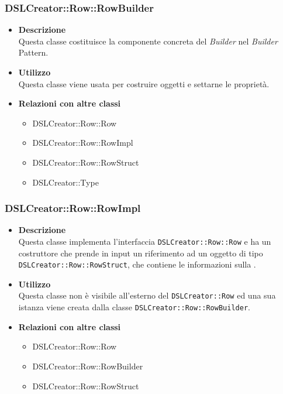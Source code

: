  \subsubsection{DSLCreator::Row::RowBuilder}
                    \begin{itemize}
                        \item \textbf{Descrizione} \hfill \\
                          Questa classe costituisce la componente concreta del \textit{Builder} nel \textit{Builder} Pattern.
                        \item \textbf{Utilizzo} \hfill \\
                          Questa classe viene usata per costruire oggetti  e settarne le proprietà.
                        \item \textbf{Relazioni con altre classi}
                            \begin{itemize}
                              \item DSLCreator::Row::Row
                              \item DSLCreator::Row::RowImpl
                              \item DSLCreator::Row::RowStruct
                              \item DSLCreator::Type
                            \end{itemize}
                    \end{itemize}  

 \subsubsection{DSLCreator::Row::RowImpl}
                    \begin{itemize}
                        \item \textbf{Descrizione} \hfill \\
                          Questa classe implementa l'interfaccia \texttt{DSLCreator::Row::Row} e ha un costruttore che prende in input un riferimento ad un oggetto di tipo \texttt{DSLCreator::Row::RowStruct}, che contiene le informazioni sulla .
                        \item \textbf{Utilizzo} \hfill \\
                          Questa classe non è visibile all'esterno del  \texttt{DSLCreator::Row} ed una sua istanza viene creata dalla classe \texttt{DSLCreator::Row::RowBuilder}.
                        \item \textbf{Relazioni con altre classi}
                            \begin{itemize}
                              \item DSLCreator::Row::Row
                              \item DSLCreator::Row::RowBuilder
                              \item DSLCreator::Row::RowStruct
                            \end{itemize}
                    \end{itemize}  


